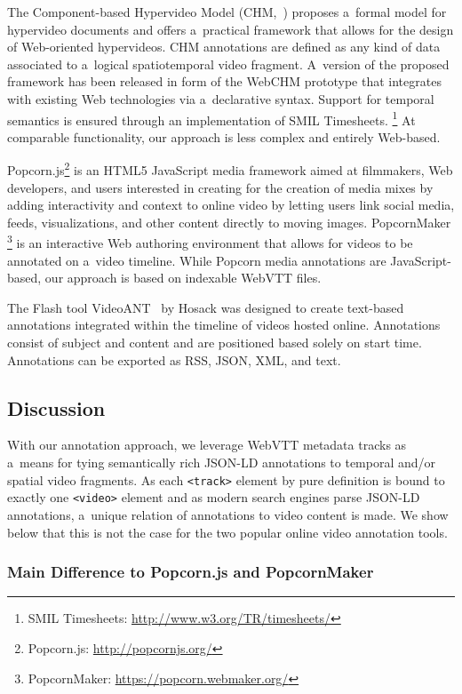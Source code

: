 \documentclass[runningheads,a4paper]{llncs}
\newcommand{\inlinelistingsize}{\fontsize{8pt}{11pt}}
\let\oldurl\url
\renewcommand{\url}[1]{\inlinelistingsize\oldurl{#1}}
\begin{document}
The Component-based Hypervideo Model
(CHM,~\cite{sadallah2012hypervideo})
proposes a~formal model for hypervideo documents
and offers a~practical framework that allows for
the design of Web-oriented hypervideos.
CHM annotations are defined as any kind of data associated to
a~logical spatiotemporal video fragment.
A~version of the proposed framework
has been released in form of the WebCHM prototype
that integrates with existing Web technologies
via a~declarative syntax.
Support for temporal semantics is ensured through
an implementation of SMIL Timesheets.%
\footnote{SMIL Timesheets:
\url{http://www.w3.org/TR/timesheets/}}
At comparable functionality, our approach is less complex
and entirely Web-based.

Popcorn.js\footnote{Popcorn.js: \url{http://popcornjs.org/}}
is an HTML5 JavaScript media framework
aimed at filmmakers, Web developers,
and users interested in creating
for the creation of media mixes
by adding interactivity and context to online video
by letting users link social media, feeds,
visualizations, and other content directly to moving images.
PopcornMaker%
\footnote{PopcornMaker: \url{https://popcorn.webmaker.org/}}
is an interactive Web authoring environment
that allows for videos to be annotated on a~video timeline.
While Popcorn media annotations are JavaScript-based,
our approach is based on indexable WebVTT files.

The Flash tool VideoANT~\cite{hosack2010videoant} by Hosack
was designed to create text-based annotations
integrated within the timeline of videos hosted online.
Annotations consist of subject and content and
are positioned based solely on start time.
Annotations can be exported as RSS, JSON, XML, and text.

\subsection{Discussion}

With our annotation approach, we leverage WebVTT
metadata tracks as a~means for tying semantically rich JSON-LD annotations
to temporal and/or spatial video fragments.
As each \texttt{<track>} element by pure definition is bound to
exactly one \texttt{<video>} element and as modern search engines
parse JSON-LD annotations,
a~unique relation of annotations to video content is made.
We show below that this is not the case for the two
popular online video annotation tools.

\subsubsection{Main Difference to Popcorn.js and PopcornMaker}
\end{document}
